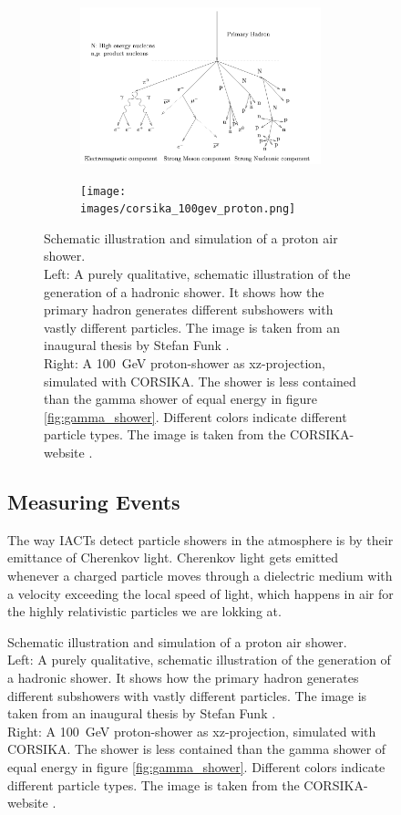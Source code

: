 \begin{figure}
\begin{figure}
	\centering
	\captionsetup{width=0.9\linewidth}
	\begin{subfigure}{.7\textwidth}
  		\centering
  		\includegraphics[width=\linewidth]{images/hadron_shower_illustration.png}
	\end{subfigure}%
	\begin{subfigure}{.2\textwidth}
 		\centering
		\texttt{[image: images/corsika\_100gev\_proton.png]}
	\end{subfigure}
	\caption{Schematic illustration and simulation of a proton air shower.\\
		Left: A purely qualitative,
		schematic illustration of the generation of a hadronic shower.
		It shows how the primary hadron generates different subshowers
		with vastly different particles.
		The image is taken from an inaugural thesis 
		by Stefan Funk \cite{funk_doctor}.\\
		Right: A \SI{100}{\giga\electronvolt} proton-shower as xz-projection,
		simulated with CORSIKA.
		The shower is less contained than the gamma shower of equal energy in 
		figure \ref{fig:gamma_shower}.
		Different colors indicate different particle types.
		The image is taken from 
		the CORSIKA-website \cite{corsika_showers}.}
	\label{fig:proton_shower}
\end{figure}

\subsection{Measuring Events}
\label{sec:measuring}

The way IACTs detect particle showers in the atmosphere is by their emittance 
of Cherenkov light. Cherenkov light gets emitted whenever a 
charged particle moves through a dielectric medium with a velocity 
exceeding the local speed of light, which happens in air for the
highly relativistic particles we are lokking at.


\end{figure}
